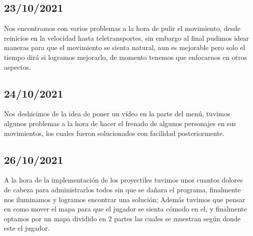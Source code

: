 \documentclass{article}
\begin{document}
    \subsection{23/10/2021}
    Nos encontramos con varios problemas a la hora de pulir el movimiento, desde reinicios en la velocidad hasta teletransportes, sin embargo al final pudimos idear maneras para que el movimiento se sienta natural, aun es mejorable pero solo el tiempo dirá si logramos mejorarlo, de momento tenemos que enfocarnos en otros aspectos.
    
    \subsection{24/10/2021}
    Nos deshicimos de la idea de poner un vídeo en la parte del menú, tuvimos algunos problemas a la hora de hacer el frenado de algunos personajes en sus movimientos, los cuales fueron solucionados con facilidad posteriormente.
    
    \subsection{26/10/2021}
    A la hora de la implementación de los proyectiles tuvimos unos cuantos dolores de cabeza para administrarlos todos sin que se dañara el programa, finalmente nos iluminamos y logramos encontrar una solución; Además tuvimos que pensar en como mover el mapa para que el jugador se sienta cómodo en el, y finalmente optamos por un mapa dividido en 2 partes las cuales se muestran según donde este el jugador.
    
\vfill
\vspace*{0.5cm}


\end{document}
